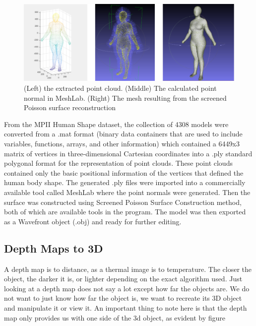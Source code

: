 \documentclass{article}
\begin{document}
    \begin{figure}[h]
        \centering
        \includegraphics{images/humanModel.png}
        \caption{(Left) the extracted point cloud. (Middle) The calculated point normal in MeshLab. (Right) The mesh resulting from the screened Poisson surface reconstruction}
        \label{(Left) the extracted point cloud. (Middle) The calculated point normal in MeshLab. (Right) The mesh resulting from the screened Poisson surface reconstruction(Left) the extracted point cloud. (Middle) The calculated point normal in MeshLab. (Right) The mesh resulting from the screened Poisson surface reconstruction}
    \end{figure}
    From the MPII Human Shape dataset, the collection of 4308 models were converted from a .mat format (binary data containers that are used to include variables, functions, arrays, and other information) which contained a 6449x3 matrix of vertices in three-dimensional Cartesian coordinates into a .ply standard polygonal format for the representation of point clouds. These point clouds contained only the basic positional information of the vertices that defined the human body shape. The generated .ply files were imported into a commercially available tool called MeshLab where the point normals were generated. Then the surface was constructed using Screened Poisson Surface Construction method, both of which are available tools in the program. The model was then exported as a Wavefront object (.obj) and ready for further editing.
    
    \subsection{Depth Maps to 3D}
    
    A depth map is to distance, as a thermal image is to temperature. The closer the object, the darker it is, or lighter depending on the exact algorithm used. Just looking at a depth map does not say a lot except how far the objects are. We do not want to just know how far the object is, we want to recreate its 3D object and manipulate it or view it. An important thing to note here is that the depth map only provides us with one side of the 3d object, as evident by figure 
\end{document}
